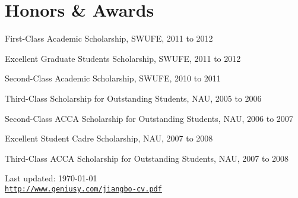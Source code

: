 \documentclass[letterpaper]{article}
\def\footerlink{http://www.geniusy.com/jiangbo-cv.pdf}
\renewenvironment{itemize}{
  \begin{list}{}{
    \setlength{\leftmargin}{1.5em}
    \setlength{\itemsep}{0pt}
  }
}{
  \end{list}
}
\begin{document}
\section*{Honors \& Awards}
\begin{itemize}
\item First-Class Academic Scholarship, SWUFE, 2011 to 2012
\item Excellent Graduate Students Scholarship, SWUFE, 2011 to 2012
\item Second-Class Academic Scholarship, SWUFE, 2010 to 2011
\item Third-Class Scholarship for Outstanding Students, NAU, 2005 to 2006
\item Second-Class ACCA Scholarship for Outstanding Students, NAU, 2006 to 2007
\item Excellent Student Cadre Scholarship, NAU, 2007 to 2008
\item Third-Class ACCA Scholarship for Outstanding Students, NAU, 2007 to 2008
\end{itemize}

\bigskip

\begin{center}
  \begin{footnotesize}
    Last updated: \today \\
    \href{\footerlink}{\texttt{\footerlink}}
  \end{footnotesize}
\end{center}
\end{document}

